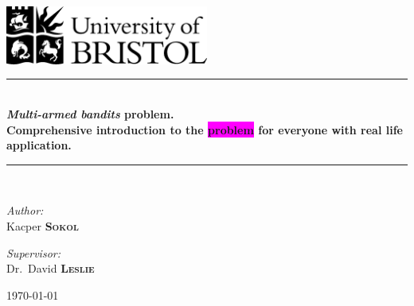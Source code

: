 \documentclass[12pt, a4paper, pdflatex]{report}
\newcommand{\HRule}{\rule{\linewidth}{0.5mm}}
\begin{document}
\begin{titlepage}
\begin{center}
\includegraphics[width=0.5\textwidth]{graphics/UOB-logo.png}~\\[4cm] %



\HRule \\[0.4cm]
{ \huge \bfseries \emph{Multi-armed bandits} problem.\\
	Comprehensive introduction to the \colorbox{magenta}{problem} for everyone with real life application. \\[0.4cm] }
\HRule \\[1.5cm]

\begin{minipage}{0.4\textwidth}
\begin{flushleft} \large
\emph{Author:}\\
Kacper \textsc{\textbf{Sokol}}
\end{flushleft}
\end{minipage}
\begin{minipage}{0.4\textwidth}
\begin{flushright} \large
\emph{Supervisor:} \\
Dr.~David \textsc{\textbf{Leslie}}
\end{flushright}
\end{minipage}

\vfill

{\large \today}
\end{center}
\end{titlepage}

\end{document}
